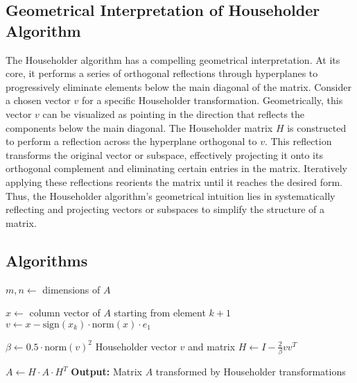 \subsection*{Geometrical Interpretation of Householder Algorithm}

The Householder algorithm has a compelling geometrical interpretation. At its core, it performs a series of orthogonal reflections through hyperplanes to progressively eliminate elements below the main diagonal of the matrix. Consider a chosen vector \(v\) for a specific Householder transformation. Geometrically, this vector \(v\) can be visualized as pointing in the direction that reflects the components below the main diagonal. The Householder matrix \(H\) is constructed to perform a reflection across the hyperplane orthogonal to \(v\). This reflection transforms the original vector or subspace, effectively projecting it onto its orthogonal complement and eliminating certain entries in the matrix. Iteratively applying these reflections reorients the matrix until it reaches the desired form. Thus, the Householder algorithm's geometrical intuition lies in systematically reflecting and projecting vectors or subspaces to simplify the structure of a matrix.


\subsection{Algorithms}

\begin{algorithmic}[1]
        \State $m, n \gets$ dimensions of $A$
        
            \State $x \gets$ column vector of $A$ starting from element $k+1$
            \State $v \gets x - \text{sign}(x_k) \cdot \text{norm}(x) \cdot e_1$ 
            
            \State $\beta \gets 0.5 \cdot \text{norm}(v)^2$
            \State Householder vector $v$ and matrix $H \gets I - \frac{2}{\beta}vv^T$
            
            \State $A \gets H \cdot A \cdot H^T$ 
        \EndFor
        \State \textbf{Output:} Matrix $A$ transformed by Householder transformations
    \EndProcedure
\end{algorithmic}



